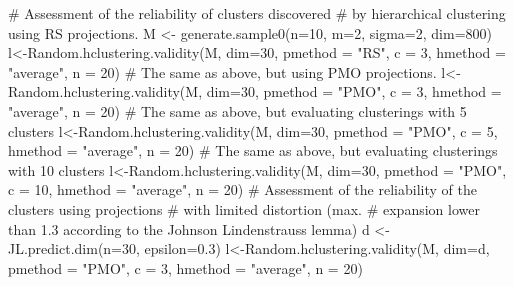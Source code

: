 \documentclass{article}
\begin{document}
\begin{Examples}
\begin{ExampleCode}
# Assessment of the reliability of clusters discovered 
# by hierarchical clustering using RS projections. 
M <- generate.sample0(n=10, m=2, sigma=2, dim=800)
l<-Random.hclustering.validity(M, dim=30, pmethod = "RS", c = 3, 
                               hmethod = "average", n = 20)
# The same as above, but using PMO projections. 
l<-Random.hclustering.validity(M, dim=30, pmethod = "PMO", c = 3, 
                               hmethod = "average", n = 20)
# The same as above, but evaluating clusterings with 5 clusters 
l<-Random.hclustering.validity(M, dim=30, pmethod = "PMO", c = 5, 
                               hmethod = "average", n = 20)
# The same as above, but evaluating clusterings with 10 clusters 
l<-Random.hclustering.validity(M, dim=30, pmethod = "PMO", c = 10, 
                               hmethod = "average", n = 20)
# Assessment of the reliability of the clusters using projections 
# with limited distortion (max. 
# expansion lower than 1.3 according to the Johnson Lindenstrauss lemma)
d <- JL.predict.dim(n=30, epsilon=0.3)
l<-Random.hclustering.validity(M, dim=d, pmethod = "PMO", c = 3, 
                               hmethod = "average", n = 20)

\end{ExampleCode}
\end{Examples}
\end{document}
